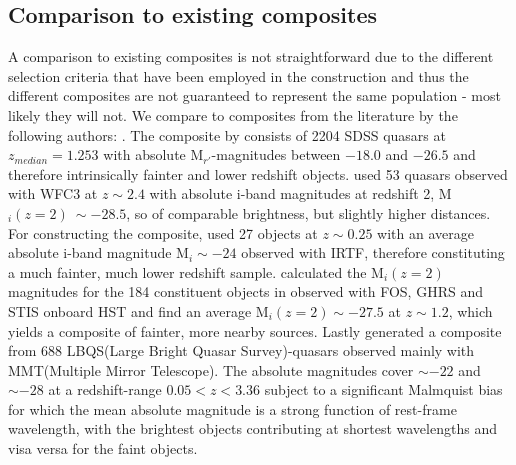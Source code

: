 \documentclass{aa}    %
\newcommand{\sectlabel}[1]{\label{sect:#1}}
\begin{document}
\subsection{Comparison to existing composites} \sectlabel{comparison}

A comparison to existing composites is not straightforward due to the different selection criteria that have been employed in the construction and thus the different composites are not guaranteed to represent the same population - most likely they will not. We compare to composites from the literature by the following authors: \citet{VandenBerk2001, Lusso2015, Glikman2006, Telfer2002, Francis1991}. The composite by \citet{VandenBerk2001} consists of 2204 SDSS quasars at $z_{median} = 1.253$ with absolute M$_{r'}$-magnitudes between $-18.0$ and $-26.5$ and therefore intrinsically fainter and lower redshift objects. \cite{Lusso2015} used 53 quasars observed with WFC3 at $z \sim 2.4$ with absolute i-band magnitudes at redshift 2, M$_i(z=2) ~\sim -28.5$, so of comparable brightness, but slightly higher distances. For constructing the composite, \cite{Glikman2006}  used 27 objects at $z \sim 0.25$ with an average absolute i-band magnitude M$_i \sim -24$ observed with IRTF, therefore constituting a much fainter, much lower redshift sample. \cite{Lusso2015} calculated the M$_i(z=2)$ magnitudes for the 184 constituent objects in \cite{Telfer2002} observed with FOS, GHRS and STIS onboard HST and find an average M$_i(z=2) \sim -27.5$ at $z \sim 1.2$, which yields a composite of fainter, more nearby sources. Lastly \cite{Francis1991} generated a composite from  688 LBQS(Large Bright Quasar Survey)-quasars observed mainly with MMT(Multiple Mirror Telescope). The absolute magnitudes cover $\sim -22$ and $\sim -28$ at a redshift-range $0.05 < z  < 3.36$ subject to a significant Malmquist bias for which the mean absolute magnitude is a strong function of rest-frame wavelength, with the brightest objects contributing at shortest wavelengths and visa versa for the faint objects. 
\end{document}

